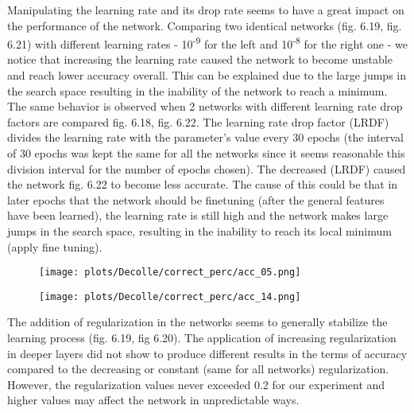 \documentclass[12pt]{report}
\begin{document}
Manipulating the learning rate and its drop rate seems to have a great impact on the performance of the network. Comparing two identical networks (fig. 6.19, fig. 6.21) with different learning rates - 10\textsuperscript{-9} for the left and 10\textsuperscript{-8} for the right one - we notice that increasing the learning rate caused the network to become unstable and reach lower accuracy overall. This can be explained due to the large jumps in the search space resulting in the inability of the network to reach a minimum. The same behavior is observed when 2 networks with different learning rate drop factors are compared fig. 6.18, fig. 6.22. The learning rate drop factor (LRDF) divides the learning rate with the parameter's value every 30 epochs (the interval of 30 epochs was kept the same for all the networks since it seems reasonable this division interval for the number of epochs chosen). The decreased (LRDF) caused the network fig. 6.22 to become less accurate. The cause of this could be that in later epochs that the network should be finetuning (after the general features have been learned), the learning rate is still high and the network makes large jumps in the search space, resulting in the inability to reach its local minimum (apply fine tuning).

\begin{figure}
\centering
\begin{minipage}{.4\textwidth}
  \centering
  \texttt{[image: plots/Decolle/correct\_perc/acc\_05.png]}
  \label{fig:test1}
\end{minipage}
\begin{minipage}{.4\textwidth}
  \centering
  \texttt{[image: plots/Decolle/correct\_perc/acc\_14.png]}
  \label{fig:test2}
\end{minipage}
\end{figure}

The addition of regularization in the networks seems to generally stabilize the learning process (fig. 6.19, fig 6.20). The application of increasing regularization in deeper layers did not show to produce different results in the terms of accuracy compared to the decreasing or constant (same for all networks) regularization. However, the regularization values never exceeded 0.2 for our experiment and higher values may affect the network in unpredictable ways.
\end{document}
